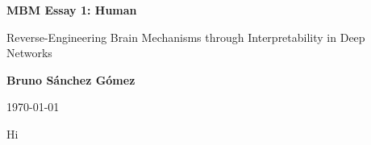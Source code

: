 \documentclass[11pt,a4paper]{article}
\begin{document}
\author{Bruno Sánchez Gómez}
\date{\today}

\begin{titlepage}
    \centering
    \vspace*{2cm}
    {\Huge \bfseries MBM Essay 1: Human \par}
    \vspace{2cm}
    {\Large {\Huge Reverse-Engineering Brain Mechanisms through Interpretability in Deep Networks} \par}
    \vspace{8cm}
    {\large \textbf{Bruno Sánchez Gómez} \par}
    \vfill
    {\large \today \par}
\end{titlepage}

Hi

%

\clearpage
\printbibliography%
\end{document}

